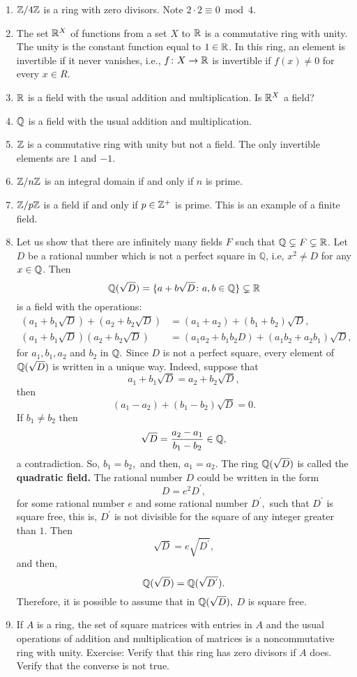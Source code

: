 \documentclass[11pt,a4paper]{article}
\begin{document}
\begin{exa}
\begin{enumerate}[label=(\roman*)]
\item \(\mathbb{Z}/4\mathbb{Z}\) is a ring with zero divisors. Note  \(2\cdot 2 \equiv 0 \bmod 4 \). 
\item The set \(\mathbb{R}^X\) of   functions from a set \(X\) to \(\mathbb{R}\) is a commutative ring with unity. The unity is the constant function equal to \(1\in \mathbb{R}\). In this ring, an element is invertible if it never vanishes, i.e., \(f\colon X\to\mathbb{R}\) is invertible if \(f(x)\neq 0\) for every \(x\in R\).
\item \(\mathbb{R}\) is a field with the usual addition and multiplication. Is \(\mathbb{R}^X\) a field?
\item \(\mathbb{Q}\) is a field with the usual addition and multiplication.
\item \(\mathbb{Z}\) is a commutative ring with unity but not a field. The only invertible elements are $1$ and $-1$.
\item \(\mathbb{Z}/n\mathbb{Z}\) is an integral domain if and only if \(n\) is prime.
\item \(\mathbb{Z}/p\mathbb{Z}\) is a field if and only if \(p\in \mathbb{Z}^+\) is prime. This is an example of a finite field. 
\item Let us show that there are infinitely many  fields \(F\) such that \(\mathbb{Q}\subsetneq F\subsetneq \mathbb{R}\). Let $D$ be a rational number which is not a perfect square in $\mathbb{Q}$, i.e, \(x^2 \neq D\) for any \(x\in \mathbb{Q}\). Then 
\[\mathbb{Q}(\sqrt{D})=\{a+b\sqrt{D}\colon a,b\in \mathbb{Q}\}\subsetneq \mathbb{R}\]
is a field with the operations:
\begin{align*}
(a_1+b_1\sqrt{D})+(a_2+b_2\sqrt{D})&=(a_1+a_2)+(b_1+b_2)\sqrt{D},\\
(a_1+b_1\sqrt{D})(a_2+b_2\sqrt{D})&=(a_1a_2+b_1b_2D)+(a_1b_2+a_2b_1)\sqrt{D},
\end{align*} 
for $a_1,b_1,a_2$ and $b_2$ in $\mathbb{Q}.$  Since $D$ is not a perfect square, every element of $\mathbb{Q}(\sqrt{D})$ is written in a unique way. Indeed,  suppose that 
\[a_1+b_1\sqrt{D}=a_2+b_2\sqrt{D},\]
then 
\[(a_1-a_2)+(b_1-b_2)\sqrt{D}=0.\]
If $b_1\neq b_2$ then \[\sqrt{D}=\frac{a_2-a_1}{b_1-b_2}\in\mathbb{Q},\]
 a contradiction. So, $b_1=b_2,$ and then, $a_1=a_2. $ The ring $\mathbb{Q}(\sqrt{D})$ is called the \textbf{quadratic field.}
 The rational number $D$ could be written in the form \[D=e^2D^{'},\] for some rational number $e$ and some rational number $D^{'},$ such that $D^{'}$ is square free, this is, $D^{'}$ is not divisible for the square of any integer greater than $1$. Then 
\[\sqrt{D}=e\sqrt{D^{'}},\]
and then, \[\mathbb{Q}(\sqrt{D})=\mathbb{Q}(\sqrt{D^{'}}).\]
Therefore, it is possible to assume that in $\mathbb{Q}(\sqrt{D}),$ $D$ is square free. 


\item If \(A\) is a ring, the set of square matrices with entries in \(A\) and the usual operations of addition and multiplication of matrices is a noncommutative ring with unity. Exercise: Verify that this ring has zero divisors if \(A\) does. Verify that the converse is not true.
\end{enumerate}

\end{exa}
   
\end{document}
